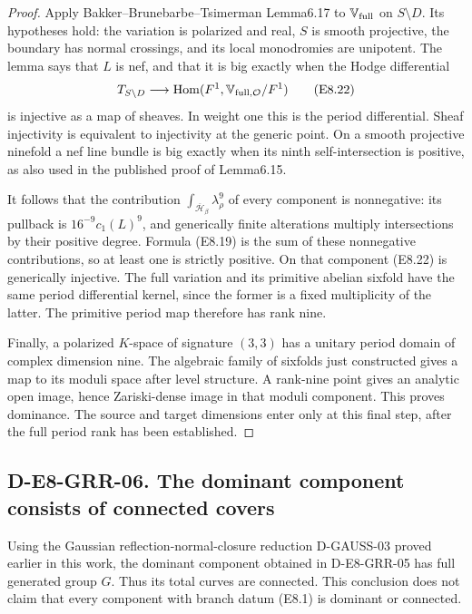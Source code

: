 \begin{proof}
Apply Bakker--Brunebarbe--Tsimerman Lemma6.17 to
$\mathbb V_{\rm full}$ on $S\setminus D$.  Its hypotheses hold:
the variation is polarized and real, $S$ is smooth projective,
the boundary has normal crossings, and its local monodromies
are unipotent.  The lemma says that $L$ is nef, and that it is
big exactly when the Hodge differential
\[
 T_{S\setminus D}\longrightarrow
       \operatorname{Hom}(F^1,\mathbb V_{\rm full,\mathcal O}/F^1)
                                                                  \tag{E8.22}
\]
is injective as a map of sheaves.  In weight one this is the
period differential.  Sheaf injectivity is equivalent to
injectivity at the generic point.  On a smooth projective
ninefold a nef line bundle is big exactly when its ninth
self-intersection is positive, as also used in the published
proof of Lemma6.15.

It follows that the contribution
$\int_{\overline{\mathcal H}_\beta}\lambda_\rho^9$ of every
component is nonnegative: its pullback is $16^{-9}c_1(L)^9$,
and generically finite alterations multiply intersections by
their positive degree.  Formula (E8.19) is the sum of these
nonnegative contributions, so at least one is strictly
positive.  On that component (E8.22) is generically injective.
The full variation and its primitive abelian sixfold have the
same period differential kernel, since the former is a fixed
multiplicity of the latter.  The primitive period map therefore
has rank nine.

Finally, a polarized $K$-space of signature $(3,3)$ has a
unitary period domain of complex dimension nine.  The
algebraic family of sixfolds just constructed gives a map to
its moduli space after level structure.  A rank-nine point
gives an analytic open image, hence Zariski-dense image in
that moduli component.  This proves dominance.  The source
and target dimensions enter only at this final step, after
the full period rank has been established.
\end{proof}

\subsection*{D-E8-GRR-06. The dominant component consists of connected covers}

Using the Gaussian reflection-normal-closure reduction D-GAUSS-03
proved earlier in this work, the dominant component obtained in
D-E8-GRR-05 has full generated group $G$.  Thus its total curves
are connected.  This conclusion does not claim that every component
with branch datum (E8.1) is dominant or connected.

